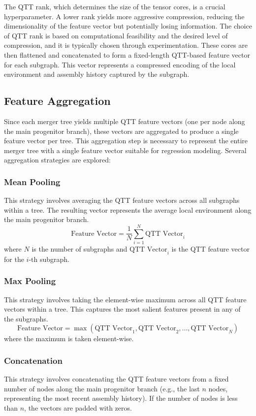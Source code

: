 \documentclass[twocolumn]{aastex631}
\begin{document}
The QTT rank, which determines the size of the tensor cores, is a crucial hyperparameter. A lower rank yields more aggressive compression, reducing the dimensionality of the feature vector but potentially losing information. The choice of QTT rank is based on computational feasibility and the desired level of compression, and it is typically chosen through experimentation. These cores are then flattened and concatenated to form a fixed-length QTT-based feature vector for each subgraph. This vector represents a compressed encoding of the local environment and assembly history captured by the subgraph.

\subsection{Feature Aggregation}

Since each merger tree yields multiple QTT feature vectors (one per node along the main progenitor branch), these vectors are aggregated to produce a single feature vector per tree. This aggregation step is necessary to represent the entire merger tree with a single feature vector suitable for regression modeling. Several aggregation strategies are explored:

\subsubsection{Mean Pooling}
This strategy involves averaging the QTT feature vectors across all subgraphs within a tree. The resulting vector represents the average local environment along the main progenitor branch.
\[
\text{Feature Vector} = \frac{1}{N} \sum_{i=1}^{N} \text{QTT Vector}_i
\]
where \(N\) is the number of subgraphs and \(\text{QTT Vector}_i\) is the QTT feature vector for the \(i\)-th subgraph.

\subsubsection{Max Pooling}
This strategy involves taking the element-wise maximum across all QTT feature vectors within a tree. This captures the most salient features present in any of the subgraphs.
\[
\text{Feature Vector} = \max(\text{QTT Vector}_1, \text{QTT Vector}_2, ..., \text{QTT Vector}_N)
\]
where the maximum is taken element-wise.

\subsubsection{Concatenation}
This strategy involves concatenating the QTT feature vectors from a fixed number of nodes along the main progenitor branch (e.g., the last \(n\) nodes, representing the most recent assembly history). If the number of nodes is less than \(n\), the vectors are padded with zeros.
\end{document}
